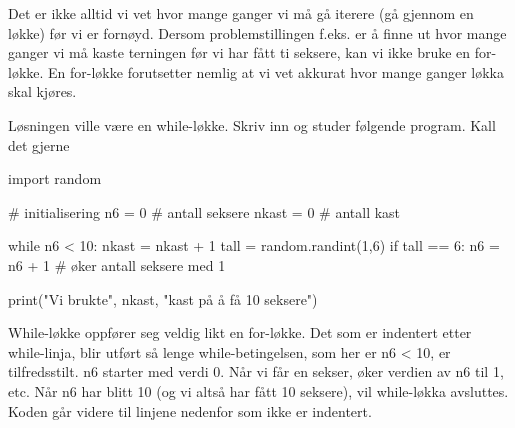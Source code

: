Det er ikke alltid vi vet hvor mange ganger vi må gå iterere (gå gjennom en løkke) før vi er fornøyd. Dersom problemstillingen f.eks. er å finne ut hvor mange ganger vi må kaste terningen før vi har fått ti seksere, kan vi ikke bruke en for-løkke. En for-løkke forutsetter nemlig at vi vet akkurat hvor mange ganger løkka skal kjøres.

Løsningen ville være en while-løkke. Skriv inn og studer følgende program. Kall det gjerne 

\begin{usncodebox}
import random

# initialisering
n6    = 0  # antall seksere
nkast = 0  # antall kast

while n6 < 10: 
    nkast = nkast + 1
    tall = random.randint(1,6)
    if tall == 6:
       n6 = n6 + 1    # øker antall seksere med 1
    
print("Vi brukte", nkast, "kast på å få 10 seksere")
\end{usncodebox}

While-løkke oppfører seg veldig likt en for-løkke. Det som er indentert etter while-linja, blir utført så lenge while-betingelsen, som her er n6 < 10, er tilfredsstilt. n6 starter med verdi 0. Når vi får en sekser, øker verdien av n6 til 1, etc. Når n6 har blitt 10 (og vi altså har fått 10 seksere), vil while-løkka avsluttes. Koden går videre til linjene nedenfor som ikke er indentert. 

